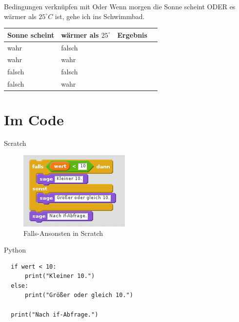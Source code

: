 \documentclass{\VorlagenPfad/coderdojokabeamer}
\begin{document}
\begin{frame}{Bedingungen verknüpfen mit Oder}
	Wenn morgen die Sonne scheint ODER es wärmer als $25^{\circ}C$ ist, gehe ich ins Schwimmbad.
	\begin{table}[t,clr]
		\begin{center}
			\begin{tabular}{|l|l|l|l|}
				\hline
				Sonne scheint	& wärmer als $25^{\circ}$	& Ergebnis	\\ \hline\hline
				wahr			& falsch					&			\\ \hline
				wahr			& wahr						&			\\ \hline
				falsch			& falsch					&			\\ \hline
				falsch			& wahr						&			\\ \hline
			\end{tabular}
		\end{center}
	\end{table}
\end{frame}

\section{Im Code}

\begin{frame}{Scratch}
  \begin{figure}[t]
    \centering
    \includegraphics[scale=.6]{scratch_if_else}
    \caption{Falls-Ansonsten in Scratch}
  \end{figure}
\end{frame}

\begin{frame}[fragile]{Python}
  \begin{verbatim}
  if wert < 10:
      print("Kleiner 10.")
  else:
      print("Größer oder gleich 10.")

  print("Nach if-Abfrage.")
  \end{verbatim}
\end{frame}
\end{document}
